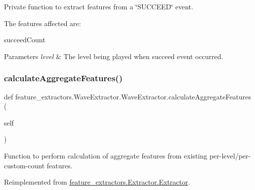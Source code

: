 Private function to extract features from a \char`\"{}\+S\+U\+C\+C\+E\+E\+D\char`\"{} event. 

The features affected are\+:
\begin{DoxyItemize}
\item succeed\+Count
\end{DoxyItemize}


\begin{DoxyParams}{Parameters}
{\em level} & The level being played when succeed event occurred. \\
\hline
\end{DoxyParams}
\mbox{\label{classfeature__extractors_1_1_wave_extractor_1_1_wave_extractor_a68b4f2df1be2e63fa34ba3813e77efbb}} 
\subsubsection{\texorpdfstring{calculateAggregateFeatures()}{calculateAggregateFeatures()}}
{\footnotesize\ttfamily def feature\+\_\+extractors.\+Wave\+Extractor.\+Wave\+Extractor.\+calculate\+Aggregate\+Features (\begin{DoxyParamCaption}\item[{}]{self }\end{DoxyParamCaption})}



Function to perform calculation of aggregate features from existing per-\/level/per-\/custom-\/count features. 



Reimplemented from \mbox{\hyperlink{classfeature__extractors_1_1_extractor_1_1_extractor_a7622c0b66dd98f59a8010c3511f4bdad}{feature\+\_\+extractors.\+Extractor.\+Extractor}}.

\mbox{\label{classfeature__extractors_1_1_wave_extractor_1_1_wave_extractor_a3dbf40e07ac5c4c28037f331cc268798}} 
